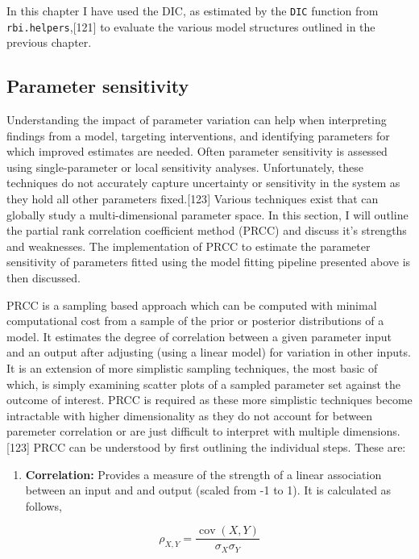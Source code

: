 \documentclass[11pt,twoside]{bristolthesis}
\providecommand{\tightlist}{%
  \setlength{\itemsep}{0pt}\setlength{\parskip}{0pt}}
\begin{document}
  In this chapter I have used the DIC, as estimated by the \texttt{DIC} function from \texttt{rbi.helpers},{[}121{]} to evaluate the various model structures outlined in the previous chapter.
  
  \hypertarget{parameter-sensitivity}{%
  \subsection{Parameter sensitivity}\label{parameter-sensitivity}}
  
  Understanding the impact of parameter variation can help when interpreting findings from a model, targeting interventions, and identifying parameters for which improved estimates are needed. Often parameter sensitivity is assessed using single-parameter or local sensitivity analyses. Unfortunately, these techniques do not accurately capture uncertainty or sensitivity in the system as they hold all other parameters fixed.{[}123{]} Various techniques exist that can globally study a multi-dimensional parameter space. In this section, I will outline the partial rank correlation coefficient method (PRCC) and discuss it's strengths and weaknesses. The implementation of PRCC to estimate the parameter sensitivity of parameters fitted using the model fitting pipeline presented above is then discussed.
  
  PRCC is a sampling based approach which can be computed with minimal computational cost from a sample of the prior or posterior distributions of a model. It estimates the degree of correlation between a given parameter input and an output after adjusting (using a linear model) for variation in other inputs. It is an extension of more simplistic sampling techniques, the most basic of which, is simply examining scatter plots of a sampled parameter set against the outcome of interest. PRCC is required as these more simplistic techniques become intractable with higher dimensionality as they do not account for between paremeter correlation or are just difficult to interpret with multiple dimensions.{[}123{]} PRCC can be understood by first outlining the individual steps. These are:
  \begin{enumerate}
  \def\labelenumi{\arabic{enumi}.}
  \tightlist
  \item
    \textbf{Correlation:} Provides a measure of the strength of a linear association between an input and and output (scaled from -1 to 1). It is calculated as follows,
  \end{enumerate}
  \[ 
  {\displaystyle \rho _{X,Y}={\frac {\operatorname {cov} (X,Y)}{\sigma _{X}\sigma _{Y}}}}
  \]
  
\end{document}
